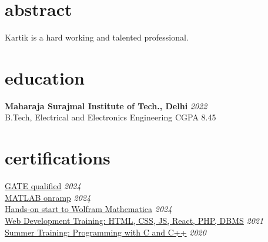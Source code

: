\documentclass[12pt]{article}
\newcommand{\entry}[4]{{{\textbf{#1}}} \hfill \textit{#3} \\ {\footnotesize #2 \hfill #4} \\}
\newcommand{\display}[3]{\footnotesize \href {#2}{#1} \hfill \textit{#3} \\}
\begin{document}
\begin{paracol}{2}
\switchcolumn


\section{abstract}
Kartik is a hard working and talented professional.



\section{education}

\entry{Maharaja Surajmal Institute of Tech., Delhi}{B.Tech, Electrical and Electronics Engineering}{2022}{CGPA 8.45}



\section{certifications}
\display{GATE qualified}{https://drive.google.com/file/d/1shcvrExVXRHoQDvvzEtomb_LwSz4b1zZ/view?usp=sharing}{2024}
\display{MATLAB onramp}{https://drive.google.com/file/d/1mkDalK8A1keLxXXYWNhQnshTT9sq1vor/view?usp=sharing}{2024}
\display{Hands-on start to Wolfram Mathematica}{https://drive.google.com/file/d/1UMcH0YTn9qbdHo8LIr4tHWEiZi-Xrejt/view?usp=sharing}{2024}
\display{Web Development Training: HTML, CSS, JS, React, PHP, DBMS}{https://drive.google.com/file/d/1BNM1FAxmFkPRrkxTPHEAF5gk_rhXNg5g/view?usp=sharing}{2021}
\display{Summer Training: Programming with C and C++}{https://drive.google.com/file/d/190HRy9cnmwrG0kCt_TeKr5rngykm1PkW/view?usp=sharing}{2020}







\end{paracol}
\end{document}
